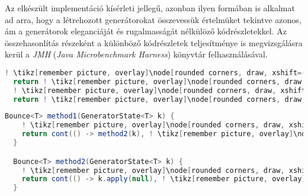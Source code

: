 Az elkészült implementáció kísérleti jellegű, azonban ilyen formában is alkalmat ad arra, hogy a létrehozott generátorokat összevessük értelmüket tekintve azonos, ám a generátorok eleganciáját és rugalmasságát nélkülöző kódrészletekkel. Az összehasonlítás részeként a különböző kódrészletek teljesítménye is megvizsgálásra kerül a \textit{JMH} (\textit{Java Microbenchmark Harness}) könyvtár felhasználásával.

\begin{center}
\begin{mdframed}
\begin{minipage}[t]{0.4\textwidth}
\begin{lstlisting}[language=Java, numbers=none, breaklines=true]
  ! \tikz[remember picture, overlay]\node[rounded corners, draw, xshift=-0.1cm, inner sep=5pt, anchor=west] {Kódrészlet \#1}; \vspace*{0.5cm} ! 
  return ! \tikz[remember picture, overlay]\node[rounded corners, draw, xshift=-0.1cm, inner sep=5pt, anchor=west, yshift=0.1cm] {Kifejezés \#1}; \vspace*{0.3cm} !
  ! \tikz[remember picture, overlay]\node[rounded corners, draw, xshift=-0.1cm, inner sep=5pt, anchor=west] {Kódrészlet \#2}; \vspace*{0.5cm} ! 
  return ! \tikz[remember picture, overlay]\node[rounded corners, draw, xshift=-0.1cm, inner sep=5pt, anchor=west, yshift=0.1cm] {Kifejezés \#2}; \vspace*{0.3cm} !
\end{lstlisting}
\end{minipage} 
\begin{minipage}[t]{0.6\textwidth}
\begin{lstlisting}[language=Java, numbers=none, breaklines=true]
  Bounce<T> method1(GeneratorState<T> k) {
    ! \tikz[remember picture, overlay]\node[rounded corners, draw, xshift=-0.1cm, inner sep=5pt, anchor=west] {Kódrészlet \#1}; \vspace*{0.3cm} !
    return cont(() -> method2(k), ! \tikz[remember picture, overlay]\node[rounded corners, draw, xshift=-0.1cm, inner sep=5pt, anchor=west, yshift=0.1cm] {Kifejezés \#1}; \vspace*{0.2cm} \hspace*{1.75cm} !);
  }

  Bounce<T> method2(GeneratorState<T> k) {
    ! \tikz[remember picture, overlay]\node[rounded corners, draw, xshift=-0.1cm, inner sep=5pt, anchor=west] {Kódrészlet \#2}; \vspace*{0.3cm} !
    return cont(() -> k.apply(null), ! \tikz[remember picture, overlay]\node[rounded corners, draw, xshift=-0.1cm, inner sep=5pt, anchor=west, yshift=0.1cm] {Kifejezés \#2}; \vspace*{0.2cm} \hspace*{1.5cm} !);
  }
\end{lstlisting} 
\end{minipage}
\end{mdframed}
\end{center}